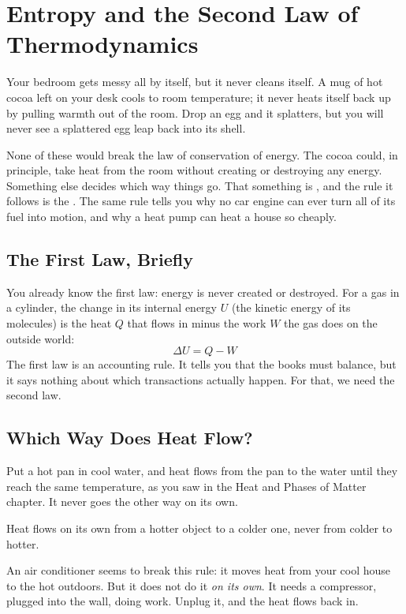 \chapter{Entropy and the Second Law of Thermodynamics}

Your bedroom gets messy all by itself, but it never cleans itself. A mug of hot cocoa left on your
desk cools to room temperature; it never heats itself back up by pulling warmth out of the room. Drop
an egg and it splatters, but you will never see a splattered egg leap back into its shell.

None of these would break the law of conservation of energy. The cocoa could, in principle, take
heat from the room without creating or destroying any energy. Something else decides which way
things go. That something is , and the rule it follows is the
. The same rule tells you why no car engine can ever turn all of
its fuel into motion, and why a heat pump can heat a house so cheaply.

\section{The First Law, Briefly}
You already know the first law: energy is never created or destroyed. For a gas in a cylinder, the
change in its internal energy $U$ (the kinetic energy of its molecules) is the heat $Q$ that flows in
minus the work $W$ the gas does on the outside world:
$$\Delta U = Q - W$$
The first law is an accounting rule. It tells you that the books must balance, but it says nothing
about which transactions actually happen. For that, we need the second law.

\section{Which Way Does Heat Flow?}
Put a hot pan in cool water, and heat flows from the pan to the water until they reach the same
temperature, as you saw in the Heat and Phases of Matter chapter. It never goes the other way on its own.

\begin{mdframed}[style = important, frametitle = {The Second Law (Heat Version)}]
Heat flows on its own from a hotter object to a colder one, never from colder to hotter.
\end{mdframed}

An air conditioner seems to break this rule: it moves heat from your cool house to the hot outdoors.
But it does not do it \emph{on its own}. It needs a compressor, plugged into the wall, doing work.
Unplug it, and the heat flows back in.

